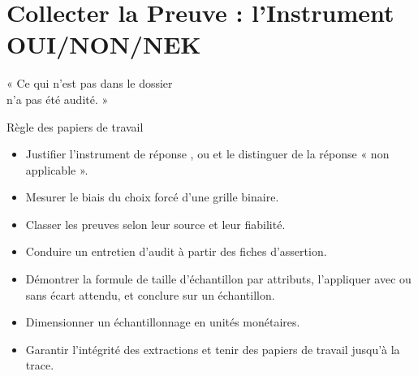 
\chapter[Collecter la Preuve]{Collecter la Preuve : l'Instrument OUI/NON/NEK}
\label{chap:preuve}

\epigraph{%
    « Ce qui n'est pas dans le dossier\\
    n'a pas été audité. »%
}{Règle des papiers de travail}


\begin{boxobjectifs}
\begin{itemize}
    \item Justifier l'instrument de réponse \OUI{}, \NON{} ou \NEK{} et le
          distinguer de la réponse « non applicable ».
    \item Mesurer le biais du choix forcé d'une grille binaire.
    \item Classer les preuves selon leur source et leur fiabilité.
    \item Conduire un entretien d'audit à partir des fiches d'assertion.
    \item Démontrer la formule de taille d'échantillon par attributs,
          l'appliquer avec ou sans écart attendu, et conclure sur un
          échantillon.
    \item Dimensionner un échantillonnage en unités monétaires.
    \item Garantir l'intégrité des extractions et tenir des papiers de
          travail jusqu'à la trace.
\end{itemize}
\end{boxobjectifs}

